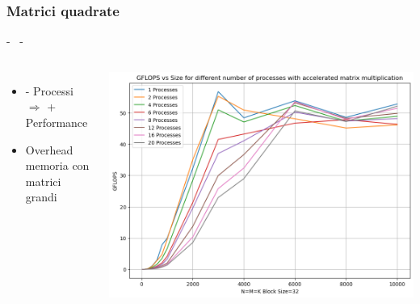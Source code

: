 \documentclass[compress]{beamer}
\begin{document}
\subsubsection*{Matrici quadrate}
\begin{frame}{\secname \text{ }- \subsecname\ \text{ }- \subsubsecname}
    \begin{columns}
            \begin{itemize}
                \item - Processi $\Rightarrow$ + Performance
                \item Overhead memoria con \\matrici grandi
            \end{itemize}
            \begin{minipage}{0.85\textwidth}
                \centering
                \begin{adjustbox}{margin=0cm 0cm 0cm 0cm, center} %
                    \includegraphics[width=1.1\textwidth, frame]{resources/mpi_cuda_square.png}
                \end{adjustbox}
            \end{minipage}
    \end{columns}
\end{frame}
\end{document}
